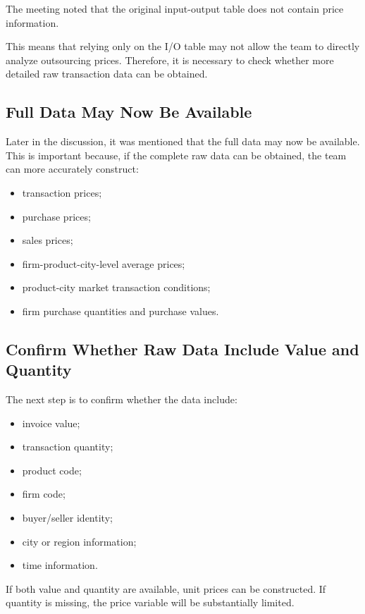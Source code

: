 \documentclass[11pt,a4paper]{article}
\begin{document}
The meeting noted that the original input-output table does not contain price information.

This means that relying only on the I/O table may not allow the team to directly analyze outsourcing prices. Therefore, it is necessary to check whether more detailed raw transaction data can be obtained.

\subsection{Full Data May Now Be Available}

Later in the discussion, it was mentioned that the full data may now be available. This is important because, if the complete raw data can be obtained, the team can more accurately construct:

\begin{itemize}
    \item transaction prices;
    \item purchase prices;
    \item sales prices;
    \item firm-product-city-level average prices;
    \item product-city market transaction conditions;
    \item firm purchase quantities and purchase values.
\end{itemize}

\subsection{Confirm Whether Raw Data Include Value and Quantity}

The next step is to confirm whether the data include:

\begin{itemize}
    \item invoice value;
    \item transaction quantity;
    \item product code;
    \item firm code;
    \item buyer/seller identity;
    \item city or region information;
    \item time information.
\end{itemize}

If both value and quantity are available, unit prices can be constructed. If quantity is missing, the price variable will be substantially limited.
\end{document}
